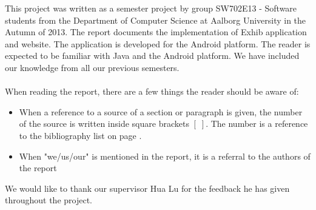 This project was written as a semester project by group SW702E13 - Software students from the Department of Computer Science at Aalborg University in the Autumn of 2013. The report documents the implementation of Exhib application and website. The application is developed for the Android platform. The reader is expected to be familiar with Java and the Android platform. We have included our knowledge from all our previous semesters.
\\\\
When reading the report, there are a few things the reader should be aware of:
\begin{itemize}
\item When a reference to a source of a section or paragraph is given, the number of the source is written inside square brackets $[\;]$. The number is a reference to the bibliography list on page \pageref{chap:bib}.
\item When "we/us/our" is mentioned in the report, it is a referral to the authors of the report
\end{itemize}
We would like to thank our supervisor Hua Lu for the feedback he has given throughout the project.
